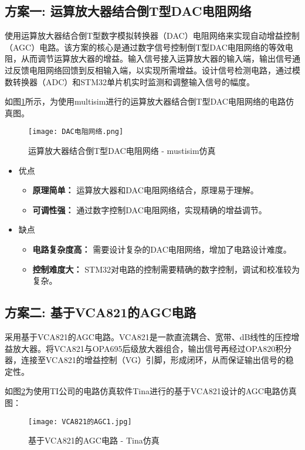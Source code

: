 \documentclass[lang=cn,11pt,a4paper]{elegantpaper}
\begin{document}
\subsection{方案一: 运算放大器结合倒T型DAC电阻网络}

使用运算放大器结合倒T型数字模拟转换器（DAC）电阻网络来实现自动增益控制（AGC）电路。该方案的核心是通过数字信号控制倒T型DAC电阻网络的等效电阻，从而调节运算放大器的增益。输入信号接入运算放大器的输入端，输出信号通过反馈电阻网络回馈到反相输入端，以实现所需增益。设计信号检测电路，通过模数转换器（ADC）和STM32单片机实时监测和调整输入信号的幅度。

如图\ref{fig:DAC_net}所示，为使用multisim进行的运算放大器结合倒T型DAC电阻网络的电路仿真图。
\begin{figure}[!htb]
  \centering
  \texttt{[image: DAC电阻网络.png]}
  \caption{运算放大器结合倒T型DAC电阻网络 - mustisim仿真}
  \label{fig:DAC_net}
\end{figure}

\begin{itemize}
  \item 优点
        \begin{itemize}
          \item \textbf{原理简单：} 运算放大器和DAC电阻网络结合，原理易于理解。
          \item \textbf{可调性强：} 通过数字控制DAC电阻网络，实现精确的增益调节。
        \end{itemize}

  \item  缺点
        \begin{itemize}
          \item \textbf{电路复杂度高：} 需要设计复杂的DAC电阻网络，增加了电路设计难度。
          \item \textbf{控制难度大：} STM32对电路的控制需要精确的数字控制，调试和校准较为复杂。
        \end{itemize}
\end{itemize}
\subsection{方案二: 基于VCA821的AGC电路}

采用基于VCA821的AGC电路。VCA821是一款直流耦合、宽带、dB线性的压控增益放大器。将VCA821与OPA695后级放大器组合，输出信号再经过OPA820积分器，连接至VCA821的增益控制（VG）引脚，形成闭环，从而保证输出信号的稳定性。

如图\ref{fig:vca_agc}为使用TI公司的电路仿真软件Tina进行的基于VCA821设计的AGC电路仿真图：
\begin{figure}[!htb]
  \centering
  \texttt{[image: VCA821的AGC1.jpg]}
  \caption{基于VCA821的AGC电路 - Tina仿真}
  \label{fig:vca_agc}
\end{figure}
\end{document}
